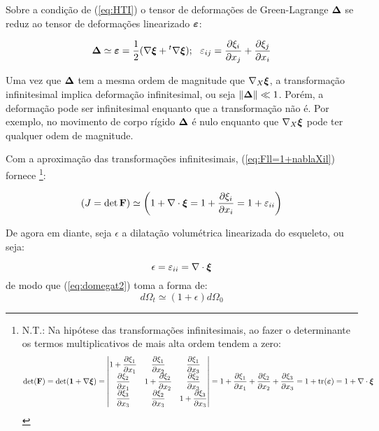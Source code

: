 \documentclass[
	11pt, %
	fleqn, %
	a4paper, %
]{LegrandOrangeBook}
\begin{document}
Sobre a condição de (\ref{eq:HTI}) o tensor de deformações de Green-Lagrange $\bm{\Delta}$ se reduz ao tensor de deformações linearizado $\bm{\varepsilon}$: 

\begin{equation}
	\label{eq:strainll}
\bm{\Delta} \simeq \bm{\varepsilon} = \dfrac{1}{2}(\nabla \bm{\xi} + {}^t\nabla \bm{\xi}); ~~ \varepsilon_{ij} =  \dfrac{\partial \xi_i}{\partial x_j} + \dfrac{\partial \xi_j}{\partial x_i}
\end{equation}

Uma vez que $\bm{\Delta}$ tem a mesma ordem de magnitude que $\nabla_X\bm{\xi}$, a transformação infinitesimal implica deformação infinitesimal, ou seja $\|\bm{\Delta}\| \ll 1$. Porém, a deformação pode ser infinitesimal enquanto que a transformação não é. Por exemplo, no movimento de corpo rígido $\bm{\Delta}$ é nulo enquanto que $\nabla_X \bm{\xi}$ pode ter qualquer odem de magnitude.

Com a aproximação das transformações infinitesimais, (\ref{eq:Fll=1+nablaXil}) fornece \footnote{N.T.: Na hipótese das transformações infinitesimais, ao fazer o determinante os termos multiplicativos de mais alta ordem tendem a zero:
\begin{displaymath}		
\det(\textbf{F}) = \det (\bm{1} + \nabla \bm{\xi}) = \begin{vmatrix}
	1+\dfrac{\partial \xi_1}{\partial x_1} & \dfrac{\partial \xi_1}{\partial x_2} & \dfrac{\partial \xi_1}{\partial x_3} \\
	\dfrac{\partial \xi_2}{\partial x_1} & 1 + \dfrac{\partial \xi_2}{\partial x_2} & \dfrac{\partial \xi_2}{\partial x_3} \\
	\dfrac{\partial \xi_3}{\partial x_3} & \dfrac{\partial \xi_2}{\partial x_3} & 1+ \dfrac{\partial \xi_3}{\partial x_3}
\end{vmatrix} = 1 + \dfrac{\partial \xi_1}{\partial x_1} + \dfrac{\partial \xi_2}{\partial x_2} + \dfrac{\partial \xi_3}{\partial x_3} = 1 + \text{tr}(\bm{\varepsilon}) = 1 + \nabla \cdot \bm{\xi}
\end{displaymath}	}:

\begin{equation}
	\label{eq:J}	
	\left(J = \det \textbf{F}\right) \simeq \left(1+\nabla \cdot \bm{\xi} = 1 + \dfrac{\partial \xi_i}{\partial x_i} = 1 + \varepsilon_{ii}\right)
\end{equation}

De agora em diante, seja $\epsilon$ a dilatação volumétrica linearizada do esqueleto, ou seja:

\begin{equation}
	\label{eq:epsilon}	
	\epsilon = \varepsilon_{ii} = \nabla \cdot \bm{\xi}
\end{equation}
de modo que (\ref{eq:domegat2}) toma a forma de:
\begin{equation}
	\label{eq:domegatlinearizado}	
	d\Omega_t \simeq (1+\epsilon)d\Omega_0
\end{equation}
\end{document}
